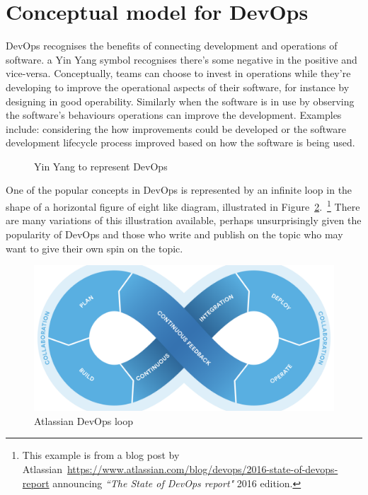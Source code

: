 \section{Conceptual model for DevOps}
DevOps recognises the benefits of connecting development and operations of software. a Yin Yang symbol recognises there's some negative in the positive and vice-versa. Conceptually, teams can choose to invest in operations while they're developing to improve the operational aspects of their software, for instance by designing in good operability. Similarly when the software is in use by observing the software's behaviours operations can improve the development. Examples include: considering the how improvements could be developed or the software development lifecycle process improved based on how the software is being used.

\begin{figure}[htbp!]
    \centering
    
    \caption{Yin Yang to represent DevOps}
    \label{fig:yinyang_for_devops}
\end{figure}



One of the popular concepts in DevOps is represented by an infinite loop in the shape of a horizontal figure of eight like diagram, illustrated in Figure~\ref{fig:atlassian-state-of-devops-report-2016-devopsloop}.~\footnote{This example is from a blog post by Atlassian~\url{https://www.atlassian.com/blog/devops/2016-state-of-devops-report} announcing \emph{``The State of DevOps report"} 2016 edition.} There are many variations of this illustration available, perhaps unsurprisingly given the popularity of DevOps and those who write and publish on the topic who may want to give their own spin on the topic.

\begin{figure}[htbp!]
    \centering
    \includegraphics[width=13cm]{images/atlassian/atlassian-state-of-devops-report-2016-devopsloop.png}
    \caption{Atlassian DevOps loop}
    \label{fig:atlassian-state-of-devops-report-2016-devopsloop}
\end{figure}



